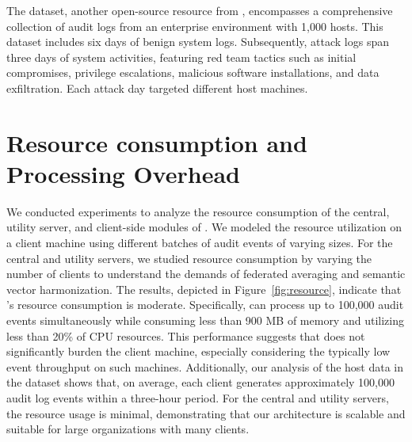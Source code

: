 The \optc dataset, another open-source resource from \darpa, encompasses a comprehensive collection of audit logs from an enterprise environment with 1,000 hosts. This dataset includes six days of benign system logs. Subsequently, attack logs span three days of system activities, featuring red team tactics such as initial compromises, privilege escalations, malicious software installations, and data exfiltration. Each attack day targeted different host machines.

\section{Resource consumption and Processing Overhead}
\label{sec:resource_consumption}

 We conducted experiments to analyze the resource consumption of the central, utility server, and client-side modules of \Sys. We modeled the resource utilization on a client machine using different batches of audit events of varying sizes. For the central and utility servers, we studied resource consumption by varying the number of clients to understand the demands of federated averaging and semantic vector harmonization. The results, depicted in Figure~\ref{fig:resource}, indicate that \Sys's resource consumption is moderate. Specifically, \Sys can process up to 100,000 audit events simultaneously while consuming less than 900 MB of memory and utilizing less than 20\% of CPU resources. This performance suggests that \Sys does not significantly burden the client machine, especially considering the typically low event throughput on such machines. Additionally, our analysis of the host data in the \optc dataset shows that, on average, each client generates approximately 100,000 audit log events within a three-hour period. For the central and utility servers, the resource usage is minimal, demonstrating that our architecture is scalable and suitable for large organizations with many clients.

